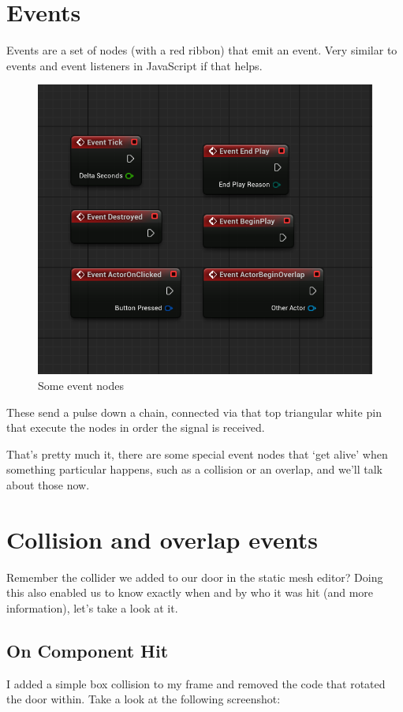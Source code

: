 \documentclass[]{article}
\begin{document}
	\section{Events}
	Events are a set of nodes (with a red ribbon) that emit an event. Very similar to events and event listeners in JavaScript if that helps.
	\begin{figure}[h!]
		\centering
		\includegraphics[width=0.6\linewidth]{day4images/screenshot005}
		\caption[]{Some event nodes}
		\label{fig:screenshot005}
	\end{figure}
	
	\newpage
	
	These send a pulse down a chain, connected via that top triangular white pin that execute the nodes in order the signal is received.
	
	That's pretty much it, there are some special event nodes that `get alive' when something particular happens, such as a collision or an overlap, and we'll talk about those now.
	
	\section{Collision and overlap events}
	 
	Remember the collider we added to our door in the static mesh editor? Doing this also enabled us to know exactly when and by who it was hit (and more information), let's take a look at it.
	
	\subsection{On Component Hit}
	I added a simple box collision to my frame and removed the code that rotated the door within. Take a look at the following screenshot:
	
\end{document}
